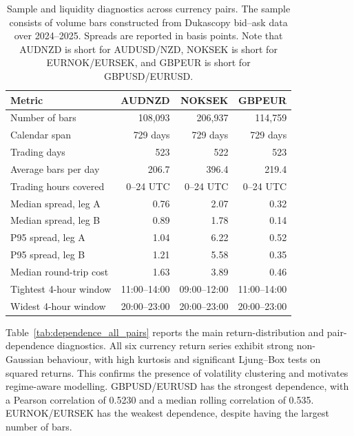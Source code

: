 \begin{table}[H]
\centering
\caption{Sample and liquidity diagnostics across currency pairs. The sample consists of volume bars constructed from Dukascopy bid--ask data over 2024--2025. Spreads are reported in basis points. Note that AUDNZD is short for AUDUSD/NZD, NOKSEK is short for EURNOK/EURSEK, and GBPEUR is short for GBPUSD/EURUSD.}
\label{tab:sample_liquidity_all_pairs}
\small
\begin{tabularx}{\linewidth}{Xrrr}
\toprule
\textbf{Metric} & \textbf{AUDNZD} & \textbf{NOKSEK} & \textbf{GBPEUR} \\
\midrule
Number of bars & 108,093 & 206,937 & 114,759 \\
Calendar span & 729 days & 729 days & 729 days \\
Trading days & 523 & 522 & 523 \\
Average bars per day & 206.7 & 396.4 & 219.4 \\
Trading hours covered & 0--24 UTC & 0--24 UTC & 0--24 UTC \\
\midrule
Median spread, leg A & 0.76 & 2.07 & 0.32 \\
Median spread, leg B & 0.89 & 1.78 & 0.14 \\
P95 spread, leg A & 1.04 & 6.22 & 0.52 \\
P95 spread, leg B & 1.21 & 5.58 & 0.35 \\
Median round-trip cost & 1.63 & 3.89 & 0.46 \\
Tightest 4-hour window & 11:00--14:00 & 09:00--12:00 & 11:00--14:00 \\
Widest 4-hour window & 20:00--23:00 & 20:00--23:00 & 20:00--23:00 \\
\bottomrule
\end{tabularx}
\end{table}

Table~\ref{tab:dependence_all_pairs} reports the main return-distribution and pair-dependence diagnostics. All six currency return series exhibit strong non-Gaussian behaviour, with high kurtosis and significant Ljung--Box tests on squared returns. This confirms the presence of volatility clustering and motivates regime-aware modelling. GBPUSD/EURUSD has the strongest dependence, with a Pearson correlation of 0.5230 and a median rolling correlation of 0.535. EURNOK/EURSEK has the weakest dependence, despite having the largest number of bars.

